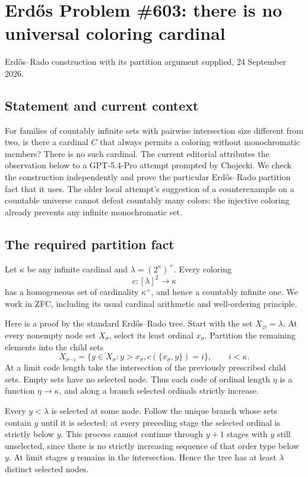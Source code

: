\section{Erd\H{o}s Problem \#603: there is no universal coloring cardinal}
\noindent Erd\H{o}s--Rado construction with its partition argument supplied, 24 September 2026.

\subsection*{Statement and current context}
For families of countably infinite sets with pairwise intersection size different from two, is there a cardinal $C$ that always permits a coloring without monochromatic members? There is no such cardinal. The current editorial attributes the observation below to a GPT-5.4-Pro attempt prompted by Chojecki. We check the construction independently and prove the particular Erd\H{o}s--Rado partition fact that it uses. The older local attempt's suggestion of a counterexample on a countable universe cannot defeat countably many colors: the injective coloring already prevents any infinite monochromatic set.

\subsection*{The required partition fact}
Let $\kappa$ be any infinite cardinal and $\lambda=(2^\kappa)^+$. Every coloring
\[c:[\lambda]^2\longrightarrow\kappa
\]
has a homogeneous set of cardinality $\kappa^+$, and hence a countably infinite one. We work in ZFC, including its usual cardinal arithmetic and well-ordering principle.

Here is a proof by the standard Erd\H{o}s--Rado tree. Start with the set $X_\varnothing=\lambda$. At every nonempty node set $X_\sigma$, select its least ordinal $x_\sigma$. Partition the remaining elements into the child sets
\[X_{\sigma^\frown i}=\{y\in X_\sigma:y>x_\sigma, c(\{x_\sigma,y\})=i\},
\qquad i<\kappa.
\]
At a limit code length take the intersection of the previously prescribed child sets. Empty sets have no selected node. Thus each code of ordinal length $\eta$ is a function $\eta\to\kappa$, and along a branch selected ordinals strictly increase.

Every $y<\lambda$ is selected at some node. Follow the unique branch whose sets contain $y$ until it is selected; at every preceding stage the selected ordinal is strictly below $y$. This process cannot continue through $y+1$ stages with $y$ still unselected, since there is no strictly increasing sequence of that order type below $y$. At limit stages $y$ remains in the intersection. Hence the tree has at least $\lambda$ distinct selected nodes.

